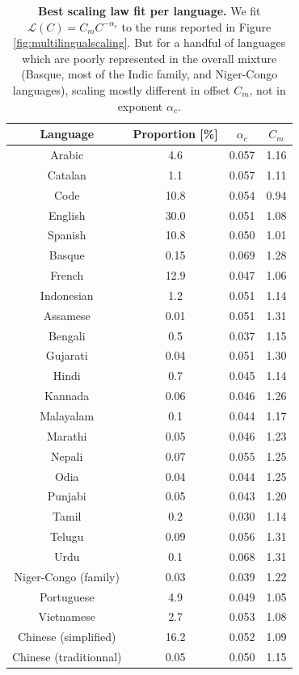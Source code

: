 \documentclass[11pt]{article}
\begin{document}
\begin{table}[h]
\label{tab:multilingualscalinglaws}
\begin{center}
\begin{tabular}{cccc}
\toprule
Language & Proportion [\%] & $\alpha_c$ & $C_m$ \\
\midrule

Arabic & 4.6 & 0.057 & 1.16 \\
Catalan & 1.1 & 0.057 & 1.11\\
Code & 10.8 & 0.054 & 0.94\\
English & 30.0 & 0.051 & 1.08 \\
Spanish & 10.8 & 0.050 & 1.01 \\
Basque & 0.15 & 0.069 & 1.28 \\
French & 12.9 & 0.047 & 1.06\\
Indonesian & 1.2 & 0.051 & 1.14\\
Assamese & 0.01 & 0.051 & 1.31\\
Bengali & 0.5 & 0.037 & 1.15\\
Gujarati & 0.04 & 0.051 & 1.30\\
Hindi & 0.7 & 0.045 & 1.14\\
Kannada & 0.06 & 0.046 & 1.26\\
Malayalam & 0.1 & 0.044 & 1.17\\
Marathi & 0.05 & 0.046 & 1.23\\
Nepali & 0.07 & 0.055 & 1.25 \\
Odia & 0.04 & 0.044 & 1.25\\
Punjabi & 0.05 & 0.043 & 1.20\\
Tamil & 0.2 & 0.030 & 1.14\\
Telugu & 0.09 & 0.056 & 1.31\\
Urdu & 0.1 & 0.068 & 1.31\\
Niger-Congo (family) & 0.03 & 0.039 & 1.22\\
Portuguese & 4.9 & 0.049 & 1.05\\
Vietnamese & 2.7 & 0.053 & 1.08\\
Chinese (simplified) & 16.2 & 0.052 & 1.09\\
Chinese (traditionnal) & 0.05 & 0.050 & 1.15\\
\bottomrule

\end{tabular}
\caption{\textbf{Best scaling law fit per language.} We fit $\mathcal{L}(C) = C_m C^{-\alpha_c}$ to the runs reported in Figure \ref{fig:multilingualscaling}. But for a handful of languages which are poorly represented in the overall mixture (Basque, most of the Indic family, and Niger-Congo languages), scaling mostly different in offset $C_m$, not in exponent $\alpha_c$.}
\end{center}

\end{table}
\end{document}
